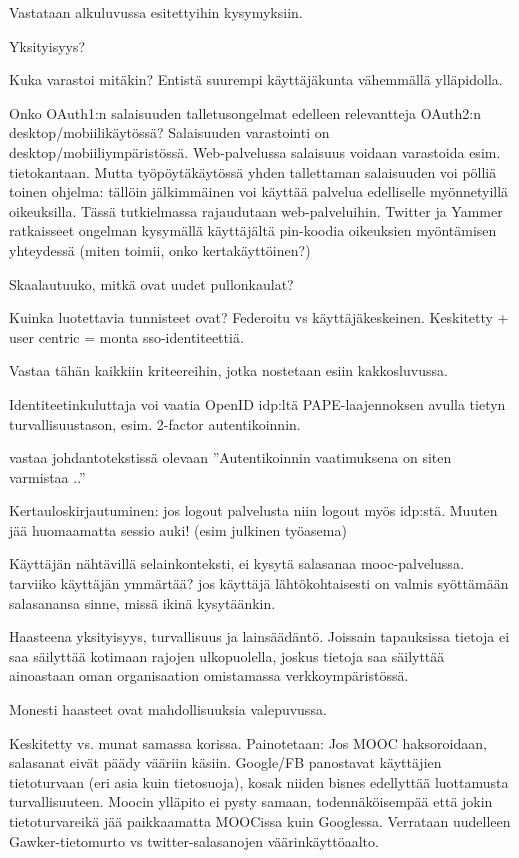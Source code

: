 \documentclass[finnish,gradu]{tktltiki}
\begin{document}
  Vastataan alkuluvussa esitettyihin kysymyksiin.

  Yksityisyys? %

  Kuka varastoi mitäkin? Entistä suurempi käyttäjäkunta vähemmällä ylläpidolla.

  Onko OAuth1:n salaisuuden talletusongelmat edelleen relevantteja OAuth2:n desktop/mobiilikäytössä?
  Salaisuuden varastointi on desktop/mobiiliympäristössä. Web-palvelussa salaisuus voidaan varastoida esim. tietokantaan. Mutta työpöytäkäytössä yhden tallettaman salaisuuden voi pölliä toinen ohjelma: tällöin jälkimmäinen voi käyttää palvelua edelliselle myönnetyillä oikeuksilla. Tässä tutkielmassa rajaudutaan web-palveluihin. Twitter ja Yammer ratkaisseet ongelman kysymällä käyttäjältä pin-koodia oikeuksien myöntämisen yhteydessä (miten toimii, onko kertakäyttöinen?) %

  Skaalautuuko, mitkä ovat uudet pullonkaulat?

  Kuinka luotettavia tunnisteet ovat? Federoitu vs käyttäjäkeskeinen. Keskitetty + user centric = monta sso-identiteettiä.

  Vastaa tähän kaikkiin kriteereihin, jotka nostetaan esiin kakkosluvussa.

  Identiteetinkuluttaja voi vaatia OpenID idp:ltä PAPE-laajennoksen avulla tietyn turvallisuustason, esim. 2-factor autentikoinnin.

  vastaa johdantotekstissä olevaan ''Autentikoinnin vaatimuksena on siten varmistaa ..''

  Kertauloskirjautuminen: jos logout palvelusta niin logout myös idp:stä. Muuten jää huomaamatta sessio auki! (esim julkinen työasema)

  Käyttäjän nähtävillä selainkonteksti, ei kysytä salasanaa mooc-palvelussa. tarviiko käyttäjän ymmärtää? jos käyttäjä lähtökohtaisesti on valmis syöttämään salasanansa sinne, missä ikinä kysytäänkin.

  Haasteena yksityisyys, turvallisuus ja lainsäädäntö. Joissain tapauksissa tietoja ei saa säilyttää kotimaan rajojen ulkopuolella, joskus tietoja saa säilyttää ainoastaan oman organisaation omistamassa verkkoympäristössä.

  Monesti haasteet ovat mahdollisuuksia valepuvussa.

  Keskitetty vs. munat samassa korissa. Painotetaan: Jos MOOC haksoroidaan, salasanat eivät päädy vääriin käsiin. Google/FB panostavat käyttäjien tietoturvaan (eri asia kuin tietosuoja), kosak niiden bisnes edellyttää luottamusta turvallisuuteen. Moocin ylläpito ei pysty samaan, todennäköisempää että jokin tietoturvareikä jää paikkaamatta MOOCissa kuin Googlessa. Verrataan uudelleen Gawker-tietomurto vs twitter-salasanojen väärinkäyttöaalto.
\end{document}
